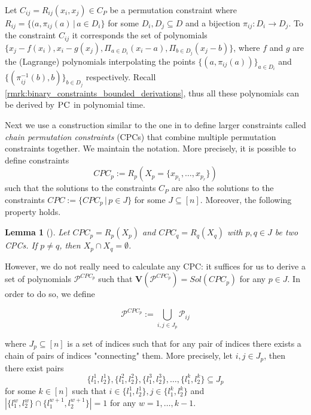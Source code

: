 \documentclass[11pt]{article}
\newcommand{\PC}{\textsc{PC}}
\newcommand{\Variety}[1]{{\textbf{V}}\left( #1 \right)}
\newcommand{\1}{\textbf{1}}
\newtheorem{lemma}[theorem]{Lemma}
\begin{document}
Let $C_{ij} = R_{ij}(x_i,x_j) \in C_P$ be a permutation constraint where $R_{ij} = \{(a, \pi_{ij}(a) \, | \, a \in D_i \}$ for some $D_i,D_j \subseteq D$ and a bijection $\pi_{ij}:D_i \rightarrow D_j$. To the constraint $C_{ij}$ it corresponds the set of polynomials $\{ x_j - f(x_i), x_i - g(x_j), \Pi_{a \in D_i} (x_i - a), \Pi_{b \in D_j}(x_j - b)\}$, where $f$ and $g$ are the (Lagrange) polynomials interpolating the points $\{(a,\pi_{ij}(a))\}_{a \in D_i}$ and $\{(\pi_{ij}^{-1}(b),b)\}_{b \in D_j}$ respectively. Recall \cref{rmrk:binary_constraints_bounded_derivations}, thus all these polynomials can be derived by $\PC$ in polynomial time.

Next we use a construction similar to the one in \cite{BharathiM21, BharathiM25} to define larger constraints called \emph{chain permutation constraints} (CPCs) that combine multiple permutation constraints together. We maintain the notation. More precisely, it is possible to define constraints
\begin{equation*}
    CPC_p := R_p(X_p = \{ x_{p_1}, \ldots, x_{p_r} \})
\end{equation*}
such that the solutions to the constraints $C_{P}$ are also the solutions to the constraints $CPC := \{CPC_p \, | \, p \in J\}$ for some $J \subseteq [n]$. Moreover, the following property holds.

\begin{lemma}[\cite{BharathiM21, BharathiM25}]
    Let $CPC_p = R_p(X_p)$ and $CPC_q = R_q(X_q)$ with $p,q \in J$ be two CPCs. If $p \neq q$, then $X_p \cap X_q = \emptyset$.
\end{lemma}

However, we do not really need to calculate any CPC: it suffices for us to derive a set of polynomials $\mathcal{P}^{CPC_p}$ such that $\Variety{\mathcal{P}^{CPC_p}} = Sol(CPC_p)$ for any $p \in J$. In order to do so, we define

\begin{equation*}
    \mathcal{P}^{CPC_p} := \bigcup_{i,j \in J_p} \mathcal{P}_{ij}
\end{equation*}

where $J_p \subseteq [n]$ is a set of indices such that for any pair of indices there exists a chain of pairs of indices "connecting" them. More precisely, let $i,j \in J_p$, then there exist pairs $$\{ l_1^1, l_2^1 \}, \{ l_1^2, l_2^2 \}, \{l_1^3, l_2^3\}, \ldots, \{l_1^k, l_2^k\} \subseteq J_p$$ for some $k \in [n]$ such that $i \in \{ l_1^1, l_2^1 \}, j \in \{l_1^k, l_2^k\}$ and $|\{l_1^w, l_2^w\} \cap \{l_1^{w+1}, l_2^{w+1}\}| = 1$ for any $w = 1, \ldots, k-1$.
\end{document}
